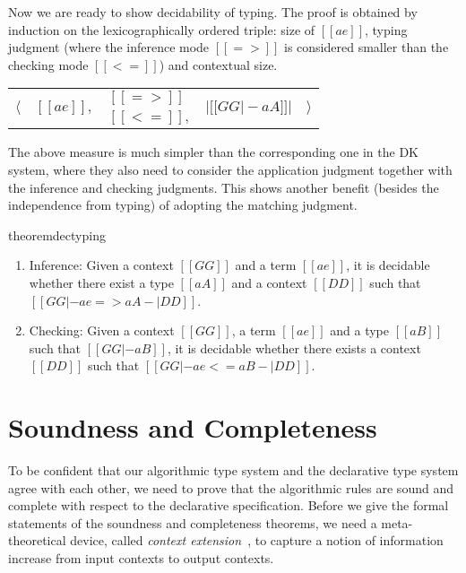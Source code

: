 Now we are ready to show decidability of typing. The proof is obtained by
induction on the lexicographically ordered triple: size of $[[ae]]$, typing
judgment (where the inference mode $[[=>]]$ is considered smaller than the
checking mode $[[<=]]$) and contextual size.
\begin{center}
\begin{tabular}{lllll}
  \multirow{2}{*}{$ \Big \langle$} & \multirow{2}{*}{$[[ae]],$} & $[[=>]]$ & \multirow{2}{*}{$| [[GG |- aA]] |$} & \multirow{2}{*}{$\Big \rangle$} \\
                                   &                    & $[[<=]],$ &  &
\end{tabular}
\end{center}
The above measure is much simpler than the corresponding one in the DK system,
where they also need to consider the application judgment together with the
inference and checking judgments. This shows another benefit (besides the
independence from typing) of adopting the matching judgment.

\begin{restatable}{theorem}{dectyping} \leavevmode
  \begin{enumerate}
  \item Inference: Given  a context $[[GG]]$ and a term $[[ae]]$, it is decidable whether
    there exist a type $[[aA]]$ and a context $[[DD]]$ such that $[[GG |- ae => aA -| DD]]$.
  \item Checking: Given a context $[[GG]]$, a term $[[ae]]$ and a type $[[aB]]$
    such that $[[GG |- aB]]$, it is decidable whether there exists a context
    $[[DD]]$ such that $[[  GG |- ae <= aB -| DD  ]]$.
  \end{enumerate}
\end{restatable}


\section{Soundness and Completeness}
\label{sec:sound:complete}

To be confident that our algorithmic type system and the declarative type system
agree with each other, we need to prove that the algorithmic rules are sound and
complete with respect to the declarative specification. Before we give the
formal statements of the soundness and completeness theorems, we need a
meta-theoretical device, called \emph{context
  extension}~\cite{dunfield2013complete}, to capture a notion of
information increase from input contexts to output contexts.

